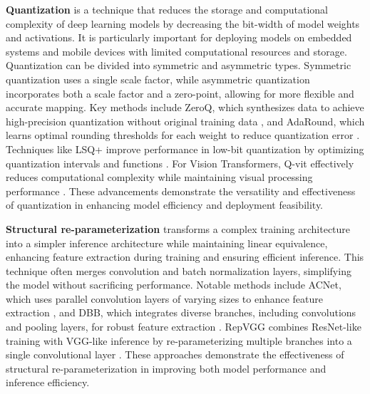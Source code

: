\documentclass[preprint,12pt]{elsarticle}
\begin{document}
\textbf{Quantization} \cite{quantization} is a technique that reduces the storage and computational complexity of deep learning models by decreasing the bit-width of model weights and activations. It is particularly important for deploying models on embedded systems and mobile devices with limited computational resources and storage. Quantization can be divided into symmetric and asymmetric types. Symmetric quantization uses a single scale factor, while asymmetric quantization incorporates both a scale factor and a zero-point, allowing for more flexible and accurate mapping. Key methods include ZeroQ, which synthesizes data to achieve high-precision quantization without original training data \cite{zeroq}, and AdaRound, which learns optimal rounding thresholds for each weight to reduce quantization error \cite{adaround}. Techniques like LSQ+ improve performance in low-bit quantization by optimizing quantization intervals and functions \cite{lsq}. For Vision Transformers, Q-vit effectively reduces computational complexity while maintaining visual processing performance \cite{qvit}. These advancements demonstrate the versatility and effectiveness of quantization in enhancing model efficiency and deployment feasibility.

\textbf{Structural re-parameterization} \cite{acnet} transforms a complex training architecture into a simpler inference architecture while maintaining linear equivalence, enhancing feature extraction during training and ensuring efficient inference. This technique often merges convolution and batch normalization layers, simplifying the model without sacrificing performance. Notable methods include ACNet, which uses parallel convolution layers of varying sizes to enhance feature extraction \cite{acnet}, and DBB, which integrates diverse branches, including convolutions and pooling layers, for robust feature extraction \cite{dbb}. RepVGG combines ResNet-like training with VGG-like inference by re-parameterizing multiple branches into a single convolutional layer \cite{repvgg}. These approaches demonstrate the effectiveness of structural re-parameterization in improving both model performance and inference efficiency.
\end{document}
